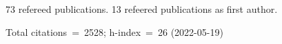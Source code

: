 73 refereed publications. 13 refeered publications as first author.

Total citations~=~2528; h-index~=~26 (2022-05-19)